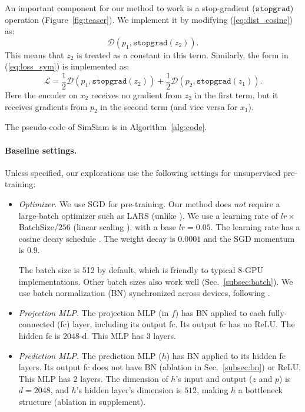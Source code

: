 \documentclass[final]{cvpr}
\newcommand{\dist}{\mathcal{D}}
\newcommand{\p}{{p}}  %
\newcommand{\z}{{z}}  %
\newcommand{\appdx}{supplement}
\begin{document}
An important component for our method to work is a \mbox{stop-gradient} ($\texttt{stopgrad}$) operation (Figure~\ref{fig:teaser}). We implement it by modifying (\ref{eq:dist_cosine}) as:
\begin{equation}
\dist(\p_1, \texttt{stopgrad}(\z_2)).
\label{eq:loss_asym_stopgrad}
\end{equation}
This means that $\z_2$ is treated as a constant in this term.
Similarly, the form in (\ref{eq:loss_sym}) is implemented as:
\begin{equation}
\mathcal{L}{=}\frac{1}{2}\dist(\p_1, \texttt{stopgrad}(\z_2)){+}\frac{1}{2}\dist(\p_2, \texttt{stopgrad}(\z_1)).
\label{eq:loss_sym_stopgrad}
\end{equation}
Here the encoder on $x_2$ receives no gradient from $\z_2$ in the first term, but it receives gradients from $\p_2$ in the second term (and vice versa for $x_1$).

The pseudo-code of SimSiam is in Algorithm~\ref{alg:code}.

\paragraph{Baseline settings.} Unless specified, our explorations use the following settings for unsupervised pre-training:
\begin{itemize}[leftmargin=*]

\item \emph{Optimizer}. We use SGD for pre-training. Our method does \emph{not} require a large-batch optimizer such as LARS \cite{You2017} (unlike \cite{Chen2020,Grill2020,Caron2020}).
We use a learning rate of $lr{\times}$BatchSize${/}256$ (linear scaling \cite{Goyal2017}), with a base $lr\!=\!0.05$. The learning rate has a cosine decay schedule \cite{Loshchilov2016,Chen2020}. The weight decay is $0.0001$ and the SGD momentum is $0.9$.

The batch size is 512 by default, which is friendly to typical 8-GPU implementations. Other batch sizes also work well (Sec.~\ref{subsec:batch}). We use batch normalization (BN) \cite{Ioffe2015} synchronized across devices, following \cite{Chen2020,Grill2020,Caron2020}.

\item \emph{Projection MLP}. The projection MLP (in $f$) has BN applied to each fully-connected (fc) layer, including its output fc. Its output fc has no ReLU. The hidden fc is $2048$-d. This MLP has 3 layers.

\item \emph{Prediction MLP}. The prediction MLP ($h$) has BN applied to its hidden fc layers. Its output fc does not have BN (ablation in Sec.~\ref{subsec:bn}) or ReLU. This MLP has 2 layers.
The dimension of $h$'s input and output ($\z$ and $\p$) is $d\!=\!2048$, and $h$'s hidden layer's dimension is $512$, making $h$ a bottleneck structure (ablation in \appdx). 

\end{itemize}
\end{document}

